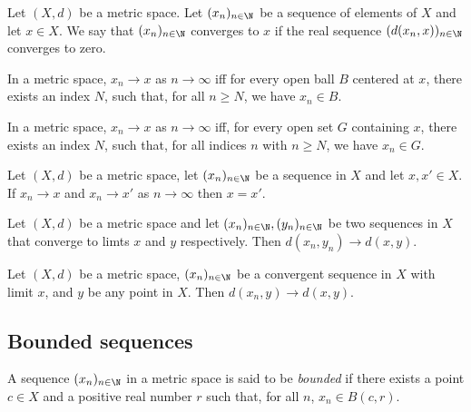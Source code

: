 \documentclass{article}
\begin{document}
\begin{definition}
    Let $(X,d)$ be a metric space. Let $(x_n)_{n\in\N}$ be a sequence of elements of $X$ and let 
    $x\in X$. We say that $(x_n)_{n\in\N}$ converges to $x$ if the real sequence $(d(x_n,x))_{n\in\N}$
    converges to zero.
\end{definition}

\begin{proposition}[Notes 5.3]
    In a metric space, $x_n\to x$ as $n\to\infty$ iff for every open ball $B$ centered at $x$, there 
    exists an index $N$, such that, for all $n\geq N$, we have $x_n\in B$.
\end{proposition}

\begin{proposition}[Notes 5.4]
    In a metric space, $x_n\to x$ as $n\to\infty$ iff, for every open set $G$ containing $x$, there 
    exists an index $N$, such that, for all indices $n$ with $n\geq N$, we have $x_n\in G$.
\end{proposition}

\begin{proposition}[Notes 5.5]
    Let $(X,d)$ be a metric space, let $(x_n)_{n\in\N}$ be a sequence in $X$ and let $x,x'\in X$.
    If $x_n\to x$ and $x_n\to x'$ as $n\to\infty$ then $x=x'$. 
\end{proposition}

\begin{proposition}[Notes 5.6]
    Let $(X,d)$ be a metric space and let $(x_n)_{n\in\N},(y_n)_{n\in\N}$ be two sequences in $X$
    that converge to limts $x$ and $y$ respectively. Then $d(x_n,y_n)\to d(x,y)$.
\end{proposition}

\begin{corollary}[Notes 5.7]
    Let $(X,d)$ be a metric space, $(x_n)_{n\in\N}$ be a convergent sequence in $X$ with limit $x$,
    and $y$ be any point in $X$. Then $d(x_n,y)\to d(x,y)$.
\end{corollary}

\subsection{Bounded sequences}

\begin{definition}
    A sequence $(x_n)_{n\in\N}$ in a metric space is said to be \emph{bounded} if there exists 
    a point $c\in X$ and a positive real number $r$ such that, for all $n$, $x_n\in B(c,r)$.
\end{definition}
\end{document}
